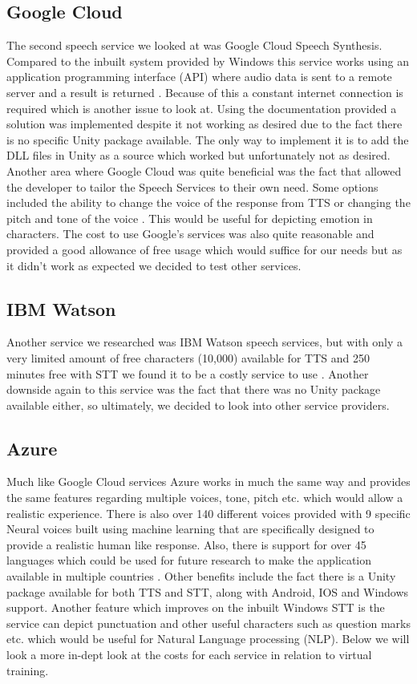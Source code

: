 \subsection{Google Cloud}
The second speech service we looked at was Google Cloud Speech Synthesis. Compared to the inbuilt system provided by Windows this service works using an application programming interface (API) where audio data is sent to a remote server and a result is returned \cite{googlespeech}. Because of this a constant internet connection is required which is another issue to look at. Using the documentation provided a solution was implemented despite it not working as desired due to the fact there is no specific Unity package available. The only way to implement it is to add the DLL files in Unity as a source which worked but unfortunately not as desired. Another area where Google Cloud was quite beneficial was the fact that allowed the developer to tailor the Speech Services to their own need. Some options included the ability to change the voice of the response from TTS or changing the pitch and tone of the voice \cite{googlespeech}. This would be useful for depicting emotion in characters. The cost to use Google's services was also quite reasonable and provided a good allowance of free usage which would suffice for our needs but as it didn't work as expected we decided to test other services. 

\subsection{IBM Watson}
Another service we researched was IBM Watson speech services, but with only a very limited amount of free characters (10,000) available for TTS and 250 minutes free with STT we found it to be a costly service to use \cite{ibmspeech}. Another downside again to this service was the fact that there was no Unity package available either, so ultimately, we decided to look into other service providers.

\subsection{Azure}
Much like Google Cloud services Azure works in much the same way and provides the same features regarding multiple voices, tone, pitch etc. which would allow a realistic experience. There is also over 140 different voices provided with 9 specific Neural voices built using machine learning that are specifically designed to provide a realistic human like response. Also, there is support for over 45 languages which could be used for future research to make the application available in multiple countries \cite{azurespeech}. Other benefits include the fact there is a Unity package available for both TTS and STT, along with Android, IOS and Windows support. Another feature which improves on the inbuilt Windows STT is the service can depict punctuation and other useful characters such as question marks etc. which would be useful for Natural Language processing (NLP). Below we will look a more in-dept look at the costs for each service in relation to virtual training.

